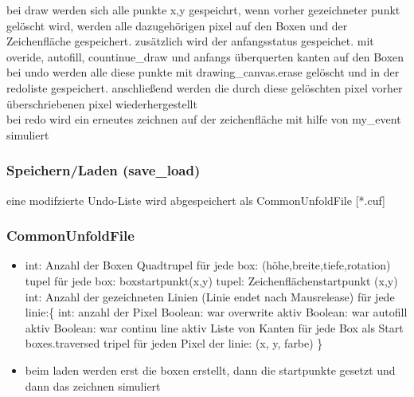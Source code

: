 bei draw werden sich alle punkte x,y gespeichrt, wenn vorher gezeichneter punkt gelöscht wird, werden alle dazugehörigen pixel auf den Boxen und der Zeichenfläche gespeichert. zusätzlich wird der anfangsstatus gespeichet. mit overide, autofill, countinue\_draw und anfangs überquerten kanten auf den Boxen bei undo werden alle diese punkte mit drawing\_canvas.erase
gelöscht und in der redoliste gespeichert. anschließend werden die
durch diese gelöschten pixel vorher überschriebenen pixel wiederhergestellt\\

bei redo wird ein erneutes zeichnen auf der zeichenfläche mit hilfe
von my\_event simuliert\\


\subsubsection{Speichern/Laden (save\_load)}
\label{subsubsec:speichernLaden}

eine modifzierte Undo-Liste wird abgespeichert als CommonUnfoldFile
{[}{*}.cuf{]}


\subsubsection{CommonUnfoldFile}
\label{subsubsec:commonunfoldfile}

\begin{itemize}
\item int: Anzahl der Boxen Quadtrupel für jede box: (höhe,breite,tiefe,rotation)
tupel für jede box: boxstartpunkt(x,y) tupel: Zeichenflächenstartpunkt
(x,y) int: Anzahl der gezeichneten Linien (Linie endet nach Mausrelease)
für jede linie:\{ int: anzahl der Pixel Boolean: war overwrite aktiv
Boolean: war autofill aktiv Boolean: war continu line aktiv Liste
von Kanten für jede Box als Start boxes.traversed tripel für jeden
Pixel der linie: (x, y, farbe) \}
\item beim laden werden erst die boxen erstellt, dann die startpunkte gesetzt
und dann das zeichnen simuliert
\end{itemize}


